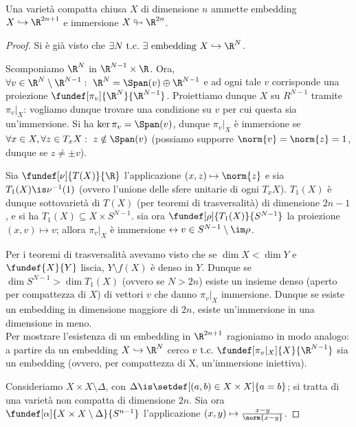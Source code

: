 

\newcommand*\tc{\ \text{t.c.} \ } %


\begin{teo}
	Una varietà compatta chiusa $X$ di dimensione $n$ ammette embedding $X \hookrightarrow \R^{2n+1}$ e immersione $X \looparrowright \R^{2n}$.
\end{teo}
\begin{proof}
Si è già visto che $\exists N \tc \exists \text{ embedding } X \hookrightarrow \R^N $.

Scomponiamo $\R^N$ in $\R^{N-1} \times \R$. Ora, $\forall v \in \R^N \setminus \R^{N-1}: \ \R^N = \Span(v) \oplus \R^{N-1}$ e ad ogni tale $v$ corrisponde una proiezione $\fundef[\pi_v]{\R^N}{\R^{N-1}}$. Proiettiamo dunque $X$ su $R^{N-1}$ tramite $\pi_v |_X$: vogliamo dunque trovare una condizione su $v$ per cui questa sia un'immersione. Si ha $\ker \pi_v = \Span(v)$, dunque $\pi_v |_X$ è immersione se $\forall x \in X, \forall z \in T_x X: \ z \notin \Span(v)$ (\wlg possiamo supporre $\norm{v} = \norm{z} = 1$, dunque se $z \neq \pm v$).

Sia $\fundef[\nu]{T(X)}{\R}$ l'applicazione $(x,z) \mapsto \norm{z}$ e sia $T_1(X) \is \nu^{-1}(1)$ (ovvero l'unione delle sfere unitarie di ogni $T_x X$). $T_1(X)$ è dunque sottovarietà di $T(X)$ (per teoremi di trasversalità) di dimensione $2n-1$, e si ha $T_1(X) \subseteq X \times S^{N-1}$. sia ora $\fundef[\rho]{T_1(X)}{S^{N-1}}$ la proiezione $(x, v) \mapsto v$; allora $\pi_v |_X$ è immersione $\leftrightarrow v \in S^{N-1} \setminus \im \rho$.

Per i teoremi di trasversalità avevamo visto che se $\dim X < \dim Y$ e $\fundef{X}{Y}$ liscia, $Y \setminus f(X)$ è denso in $Y$. Dunque se $\dim S^{N-1} > \dim T_1(X)$ (ovvero se $N > 2n$) esiste un insieme denso (aperto per compattezza di $X$) di vettori $v$ che danno $\pi_v |_X$ immersione. Dunque se esiste un embedding in dimensione maggiore di $2n$, esiste un'immersione in una dimensione in meno. \\

Per mostrare l'esistenza di un embedding in $\R^{2n+1}$ ragioniamo in modo analogo: a partire da un embedding $X \hookrightarrow \R^N$ cerco $v \tc \fundef[\pi_v |_X]{X}{\R^{N-1}}$ sia un embedding (ovvero, per compattezza di X, un'immersione iniettiva).

Consideriamo $X \times X \setminus \Delta$, con $\Delta \is \setdef[(a,b) \in X \times X]{a=b}$; si tratta di una varietà non compatta di dimensione $2n$. Sia ora $\fundef[\alpha]{X \times X \setminus \Delta}{S^{n-1}}$ l'applicazione $(x,y) \mapsto \frac{x-y}{\norm{x-y}} $.


\end{proof}
